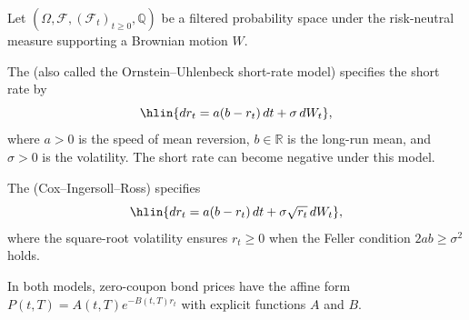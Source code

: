 \begin{definition} \label{definition:vasicek_and_cir_short_rate_models_for_interest_rates}
Let $(\Omega, \mathcal{F}, (\mathcal{F}_t)_{t \geq 0}, \mathbb{Q})$ be a filtered probability space under the risk-neutral measure supporting a Brownian motion $W$.

The  (also called the Ornstein--Uhlenbeck short-rate model) specifies the short rate by
$$\hlin{dr_t = a(b - r_t) \, dt + \sigma \, dW_t},$$
where $a > 0$ is the speed of mean reversion, $b \in \mathbb{R}$ is the long-run mean, and $\sigma > 0$ is the volatility. The short rate can become negative under this model.

The  (Cox--Ingersoll--Ross) specifies
$$\hlin{dr_t = a(b - r_t) \, dt + \sigma \sqrt{r_t} \, dW_t},$$
where the square-root volatility ensures $r_t \geq 0$ when the Feller condition $2ab \geq \sigma^2$ holds.

In both models, zero-coupon bond prices have the affine form $P(t, T) = A(t, T)e^{-B(t, T)r_t}$ with explicit functions $A$ and $B$.
\end{definition}